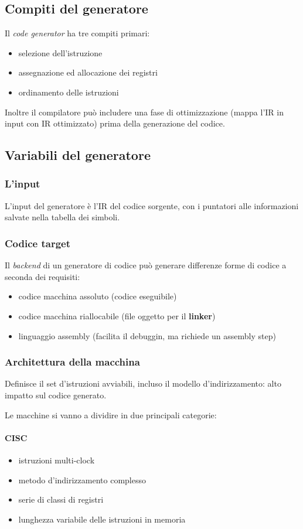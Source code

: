 \subsection{Compiti del generatore}
Il \textit{code generator} ha tre compiti primari:
\begin{itemize}
\item selezione dell'istruzione
\item assegnazione ed allocazione dei registri
\item ordinamento delle istruzioni
\end{itemize}

Inoltre il compilatore pu\`o includere una fase di ottimizzazione (mappa l'IR
in input con IR ottimizzato) prima della generazione del codice.

\subsection{Variabili del generatore}
\subsubsection{L'input}
L'input del generatore \`e l'IR del codice sorgente, con i puntatori alle
informazioni salvate nella tabella dei simboli.
\subsubsection{Codice target}
Il \textit{backend} di un generatore di codice pu\`o generare differenze forme
di codice a seconda dei requisiti:
\begin{itemize}
\item codice macchina assoluto (codice eseguibile)
\item codice macchina riallocabile (file oggetto per il \textbf{linker})
\item linguaggio assembly (facilita il debuggin, ma richiede un assembly step)
\end{itemize}

\subsubsection{Architettura della macchina}
Definisce il set d'istruzioni avviabili, incluso il modello d'indirizzamento:
alto impatto sul codice generato.

Le macchine si vanno a dividire in due principali categorie:
\paragraph{CISC}
\begin{itemize}
\item istruzioni multi-clock
\item metodo d'indirizzamento complesso
\item serie di classi di registri
\item lunghezza variabile delle istruzioni in memoria
\end{itemize}

